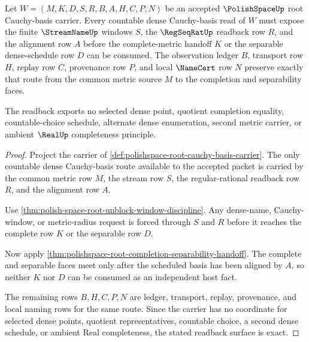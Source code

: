 \begin{theorem}
\label{thm:polishspace-root-countable-dense-cauchy-readback}
Let $W=(M,K,D,S,R,B,A,H,C,P,N)$ be an accepted $\PolishSpaceUp$ root Cauchy-basis carrier. Every countable dense Cauchy-basis read of $W$ must expose the finite $\StreamNameUp$ windows $S$, the $\RegSeqRatUp$ readback row $R$, and the alignment row $A$ before the complete-metric handoff $K$ or the separable dense-schedule row $D$ can be consumed. The observation ledger $B$, transport row $H$, replay row $C$, provenance row $P$, and local $\NameCert$ row $N$ preserve exactly that route from the common metric source $M$ to the completion and separability faces.

The readback exports no selected dense point, quotient completion equality, countable-choice schedule, alternate dense enumeration, second metric carrier, or ambient $\RealUp$ completeness principle.
\end{theorem}
\begin{proof}
Project the carrier of \autoref{def:polishspace-root-cauchy-basis-carrier}. The only countable dense Cauchy-basis route available to the accepted packet is carried by the common metric row $M$, the stream row $S$, the regular-rational readback row $R$, and the alignment row $A$.

Use \autoref{thm:polish-space-root-unblock-window-discipline}. Any dense-name, Cauchy-window, or metric-radius request is forced through $S$ and $R$ before it reaches the complete row $K$ or the separable row $D$.

Now apply \autoref{thm:polishspace-root-completion-separability-handoff}. The complete and separable faces meet only after the scheduled basis has been aligned by $A$, so neither $K$ nor $D$ can be consumed as an independent host fact.

The remaining rows $B,H,C,P,N$ are ledger, transport, replay, provenance, and local naming rows for the same route. Since the carrier has no coordinate for selected dense points, quotient representatives, countable choice, a second dense schedule, or ambient Real completeness, the stated readback surface is exact.
\end{proof}

